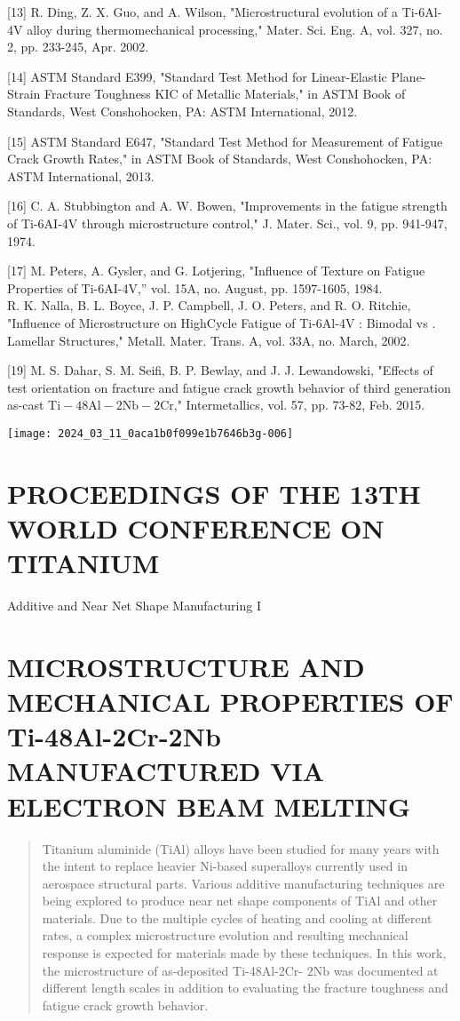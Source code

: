 \documentclass[10pt]{article}
\begin{document}
[13] R. Ding, Z. X. Guo, and A. Wilson, "Microstructural evolution of a Ti-6Al-4V alloy during thermomechanical processing," Mater. Sci. Eng. A, vol. 327, no. 2, pp. 233-245, Apr. 2002.

[14] ASTM Standard E399, "Standard Test Method for Linear-Elastic Plane-Strain Fracture Toughness KIC of Metallic Materials," in ASTM Book of Standards, West Conshohocken, PA: ASTM International, 2012.

[15] ASTM Standard E647, "Standard Test Method for Measurement of Fatigue Crack Growth Rates," in ASTM Book of Standards, West Conshohocken, PA: ASTM International, 2013.

[16] C. A. Stubbington and A. W. Bowen, "Improvements in the fatigue strength of Ti-6AI-4V through microstructure control," J. Mater. Sci., vol. 9, pp. 941-947, 1974.

[17] M. Peters, A. Gysler, and G. Lotjering, "Influence of Texture on Fatigue Properties of Ti-6AI-4V,” vol. 15A, no. August, pp. 1597-1605, 1984.\\
R. K. Nalla, B. L. Boyce, J. P. Campbell, J. O. Peters, and R. O. Ritchie, "Influence of Microstructure on HighCycle Fatigue of Ti-6Al-4V : Bimodal vs . Lamellar Structures," Metall. Mater. Trans. A, vol. 33A, no. March, 2002.

[19] M. S. Dahar, S. M. Seifi, B. P. Bewlay, and J. J. Lewandowski, "Effects of test orientation on fracture and fatigue crack growth behavior of third generation as-cast $\mathrm{Ti}-48 \mathrm{Al}-2 \mathrm{Nb}-2 \mathrm{Cr}$," Intermetallics, vol. 57, pp. 73-82, Feb. 2015.

\begin{center}
\texttt{[image: 2024\_03\_11\_0aca1b0f099e1b7646b3g-006]}
\end{center}

\section*{PROCEEDINGS OF THE 13TH WORLD CONFERENCE ON TITANIUM}
Additive and Near Net Shape Manufacturing I

\section*{MICROSTRUCTURE AND MECHANICAL PROPERTIES OF Ti-48Al-2Cr-2Nb MANUFACTURED VIA ELECTRON BEAM MELTING }


\begin{abstract}
Titanium aluminide (TiAl) alloys have been studied for many years with the intent to replace heavier Ni-based superalloys currently used in aerospace structural parts. Various additive manufacturing techniques are being explored to produce near net shape components of TiAl and other materials. Due to the multiple cycles of heating and cooling at different rates, a complex microstructure evolution and resulting mechanical response is expected for materials made by these techniques. In this work, the microstructure of as-deposited Ti-48Al-2Cr- $2 \mathrm{Nb}$ was documented at different length scales in addition to evaluating the fracture toughness and fatigue crack growth behavior.
\end{abstract}
\end{document}
